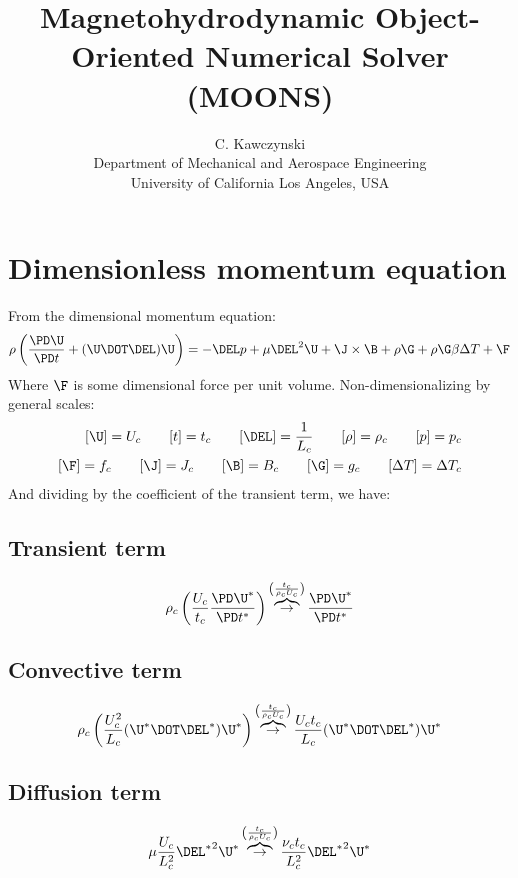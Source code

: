 \documentclass[11pt]{article}
\newcommand{\OB}{\overbrace{\rightarrow}^{\left(\frac{t_c}{\rho_c U_c}\right)}}
\begin{document}
\doublespacing
\title{Magnetohydrodynamic Object-Oriented Numerical Solver (MOONS)}
\author{C. Kawczynski \\
Department of Mechanical and Aerospace Engineering \\
University of California Los Angeles, USA\\
}
\maketitle

\section{Dimensionless momentum equation}
From the dimensional momentum equation:
\begin{equation}
	\rho \left( \frac{\PD \U}{\PD t} + (\U \DOT \DEL) \U \right) =
	-\DEL p + \mu \DEL^2 \U + \J \times \B + \rho \G + \rho \G \beta \Delta T + \F
\end{equation}
Where $\F$ is some dimensional force per unit volume. Non-dimensionalizing by general scales:
\begin{equation}\begin{aligned}
	[\U] = U_c \qquad
	[t] = t_c \qquad
	[\DEL] = \frac{1}{L_c} \qquad
	[\rho] = \rho_c \qquad
	[p] = p_c \\
	[\F] = f_c \qquad
	[\J] = J_c \qquad
	[\B] = B_c \qquad
	[\G] = g_c \qquad
	[\Delta T] = \Delta T_c
\end{aligned}\end{equation}
And dividing by the coefficient of the transient term, we have:
\subsection{Transient term}
\begin{equation}
	\rho_c \left( \frac{U_c}{t_c} \frac{\PD \U^*}{\PD t^*} \right)
	\OB
	\frac{\PD \U^*}{\PD t^*}
\end{equation}
\subsection{Convective term}
\begin{equation}
	\rho_c \left( \frac{U_c^2}{L_c} (\U^* \DOT \DEL^*) \U^* \right)
	\OB
	\frac{U_c t_c}{L_c} (\U^* \DOT \DEL^*) \U^*
\end{equation}
\subsection{Diffusion term}
\begin{equation}
	\mu \frac{U_c}{L_c^2} {\DEL^*}^2 \U^*
	\OB
	\frac{\nu_c t_c}{L_c^2} {\DEL^*}^2 \U^*
\end{equation}
\end{document}
